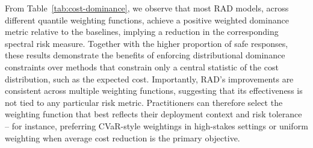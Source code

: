 
From Table~\ref{tab:cost-dominance}, we observe that most RAD models, across different quantile weighting functions, achieve a positive weighted dominance metric relative to the baselines, implying a  reduction in the corresponding spectral risk measure. Together with the higher proportion of safe responses, these results demonstrate the benefits of enforcing distributional dominance constraints over
methods that constrain only a central statistic of the cost distribution, such as the expected cost. Importantly, RAD's improvements are consistent across multiple weighting functions, suggesting that its effectiveness is not tied to any particular risk
metric. Practitioners can therefore select the weighting function that best reflects their deployment context and risk tolerance --
for instance, preferring CVaR-style weightings in high-stakes settings or uniform weighting when average cost reduction is the primary objective.

